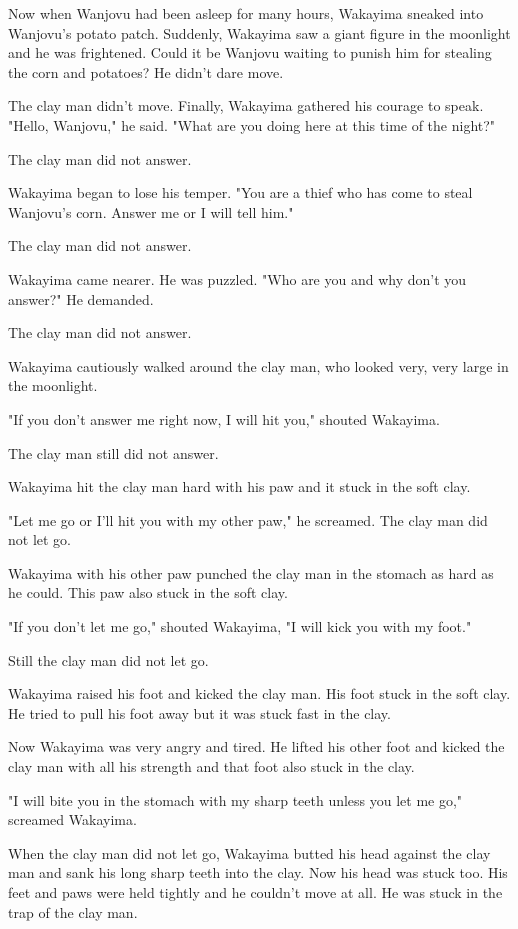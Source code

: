 Now when Wanjovu had been asleep for many hours, Wakayima sneaked into Wanjovu's potato patch. Suddenly, Wakayima saw a giant figure in the moonlight and he was frightened. Could it be Wanjovu waiting to punish him for stealing the corn and potatoes? He didn't dare move.

The clay man didn't move. Finally, Wakayima gathered his courage to speak. "Hello, Wanjovu," he said. "What are you doing here at this time of the night?"

The clay man did not answer.

Wakayima began to lose his temper. "You are a thief who has come to steal Wanjovu's corn. Answer me or I will tell him."

The clay man did not answer.

Wakayima came nearer. He was puzzled. "Who are you and why don't you answer?" He demanded.

The clay man did not answer.

Wakayima cautiously walked around the clay man, who looked very, very large in the moonlight.

"If you don't answer me right now, I will hit you," shouted Wakayima.

The clay man still did not answer.

Wakayima hit the clay man hard with his paw and it stuck in the soft clay.

"Let me go or I'll hit you with my other paw," he screamed. The clay man did not let go.

Wakayima with his other paw punched the clay man in the stomach as hard as he could. This paw also stuck in the soft clay.

"If you don't let me go," shouted Wakayima, "I will kick you with my foot."

Still the clay man did not let go.

Wakayima raised his foot and kicked the clay man. His foot stuck in the soft clay. He tried to pull his foot away but it was stuck fast in the clay.

Now Wakayima was very angry and tired. He lifted his other foot and kicked the clay man with all his strength and that foot also stuck in the clay.

"I will bite you in the stomach with my sharp teeth unless you let me go," screamed Wakayima.

When the clay man did not let go, Wakayima butted his head against the clay man and sank his long sharp teeth into the clay. Now his head was stuck too. His feet and paws were held tightly and he couldn't move at all. He was stuck in the trap of the clay man.

